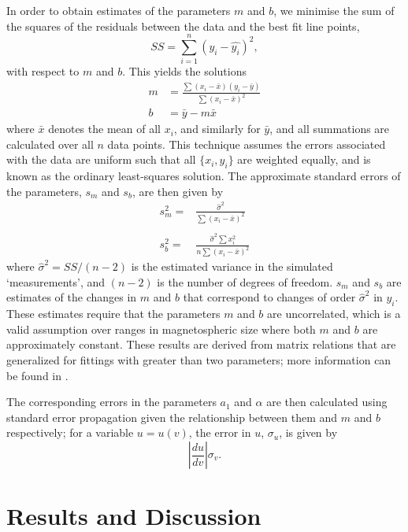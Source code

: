 In order to obtain estimates of the parameters $m$ and $b$, we minimise the sum of the squares of the residuals between the data and the best fit line points,
\begin{equation}
SS = \sum\limits_{i=1}^{n}(y_i-\hat{y_i})^2,
\end{equation}
with respect to $m$ and $b$. This yields the solutions
\begin{align}
 m &= \frac{\sum(x_i-\bar{x})(y_i-\bar{y})}{\sum(x_i-\bar{x})^2} \nonumber\\ 
 b & =  \bar{y} - m\bar{x} 
\end{align}
where $\bar{x}$ denotes the mean of all $x_i$, and similarly for $\bar{y}$, and all summations are calculated over all $n$ data points. This technique assumes the errors associated with the data are uniform such that all $\{x_i,y_i\}$ are weighted equally, and is known as the ordinary least-squares solution. The approximate standard errors of the parameters, $s_m$ and $s_b$, are then given by
\begin{align}
s_m^2 = & \frac{\hat{\sigma}^2}{\sum(x_i-\bar{x})^2}\nonumber\\
\nonumber\\
s_b^2 = & \frac{\hat{\sigma}^2\sum x_i^2}{n\sum(x_i-\bar{x})^2}
\end{align}
where $\hat{\sigma}^2 = SS/(n-2)$ is the estimated variance in the simulated `measurements', and $(n-2)$ is the number of degrees of freedom. $s_m$ and $s_b$ are estimates of the changes in $m$ and $b$ that correspond to changes of order $\hat{\sigma}^2$ in $y_i$. These estimates require that the parameters $m$ and $b$ are uncorrelated, which is a valid assumption over ranges in magnetospheric size where both $m$ and $b$ are approximately constant. These results are derived from matrix relations that are generalized for fittings with greater than two parameters; more information can be found in \citet{yang2005}.

The corresponding errors in the parameters $a_1$ and $\alpha$ are then calculated using standard error propagation given the relationship between them and $m$ and $b$ respectively; for a variable $u = u(v)$, the error in $u$, $\sigma_u$, is given by
\begin{equation}
\left|\frac{du}{dv}\right|\sigma_v.
\end{equation} 

\section{Results and Discussion}\label{compress:sec:results}
